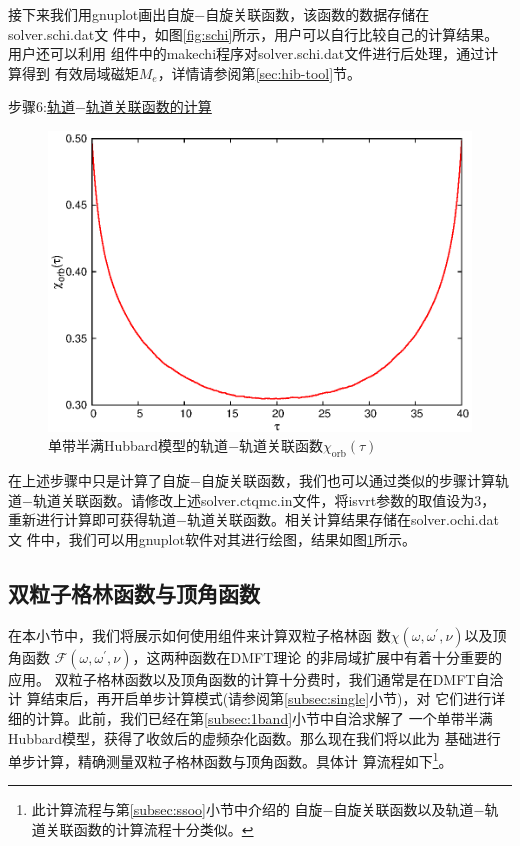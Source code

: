接下来我们用gnuplot画出自旋$-$自旋关联函数，该函数的数据存储在solver.schi.dat文
件中，如图\ref{fig:schi}所示，用户可以自行比较自己的计算结果。用户还可以利用
{\hibiscus}组件中的makechi程序对solver.schi.dat文件进行后处理，通过计算得到
有效局域磁矩$M_{e}$，详情请参阅第\ref{sec:hib-tool}节。

步骤6:\underline{轨道$-$轨道关联函数的计算}

\begin{figure}
\centering
\includegraphics{figure/ochi.eps}
\caption{单带半满Hubbard模型的轨道$-$轨道关联函数$\chi_{\text{orb}}(\tau)$} 
\label{fig:ochi}
\end{figure}

在上述步骤中只是计算了自旋$-$自旋关联函数，我们也可以通过类似的步骤计算轨
道$-$轨道关联函数。请修改上述solver.ctqmc.in文件，将isvrt参数的取值设为3，
重新进行计算即可获得轨道$-$轨道关联函数。相关计算结果存储在solver.ochi.dat文
件中，我们可以用gnuplot软件对其进行绘图，结果如图\ref{fig:ochi}所示。

\subsection{双粒子格林函数与顶角函数}
\label{subsec:vertex}

在本小节中，我们将展示如何使用{\gardenia}组件来计算双粒子格林函
数$\chi(\omega,\omega^{\prime},\nu)$以及顶角函数
$\mathcal{F}(\omega,\omega^{\prime},\nu)$，这两种函数在DMFT理论
的非局域扩展中有着十分重要的应用\cite{slezak:435604,rubtsov:033101,toschi:045118}。
双粒子格林函数以及顶角函数的计算十分费时，我们通常是在DMFT自洽计
算结束后，再开启单步计算模式(请参阅第\ref{subsec:single}小节)，对
它们进行详细的计算。此前，我们已经在第\ref{subsec:1band}小节中自洽求解了
一个单带半满Hubbard模型，获得了收敛后的虚频杂化函数。那么现在我们将以此为
基础进行单步计算，精确测量双粒子格林函数与顶角函数。具体计
算流程如下\footnote{此计算流程与第\ref{subsec:ssoo}小节中介绍的
自旋$-$自旋关联函数以及轨道$-$轨道关联函数的计算流程十分类似。}。


